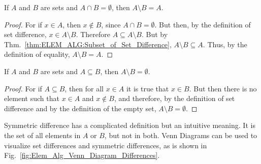 \documentclass[crop=false,class=book,oneside]{standalone}
\begin{document}
            \begin{theorem}
                If $A$ and $B$ are sets and $A\cap{B}=\emptyset$,
                then $A\setminus{B}=A$.
            \end{theorem}
            \begin{proof}
                For if $x\in{A}$, then $x\notin{B}$,
                since $A\cap{B}=\emptyset$. But then, by the
                definition of set difference,
                $x\in{A}\setminus{B}$. Therefore
                $A\subseteq{A}\setminus{B}$. But by
                Thm.~\ref{thm:ELEM_ALG:Subset_of_Set_Difference},
                $A\setminus{B}\subseteq{A}$. Thus, by the
                definition of equality,
                $A\setminus{B}=A$.
            \end{proof}
            \begin{theorem}
                If $A$ and $B$ are sets and $A\subseteq{B}$,
                then $A\setminus{B}=\emptyset$.
            \end{theorem}
            \begin{proof}
                For if $A\subseteq{B}$, then for all
                $x\in{A}$ it is true that $x\in{B}$. But then
                there is no element such that
                $x\in{A}$ and $x\notin{B}$, and therefore, by
                the definition of set difference and by the
                definition of the empty set,
                $A\setminus{B}=\emptyset$.
            \end{proof}
            Symmetric difference has a complicated definition
            but an intuitive meaning. It is the set of all
            elements in $A$ or $B$, but not in both.
            Venn Diagrams can be used to visualize set
            differences and symmetric differences, as is shown in
            Fig.~\ref{fig:Elem_Alg_Venn_Diagram_Differences}.
\end{document}
